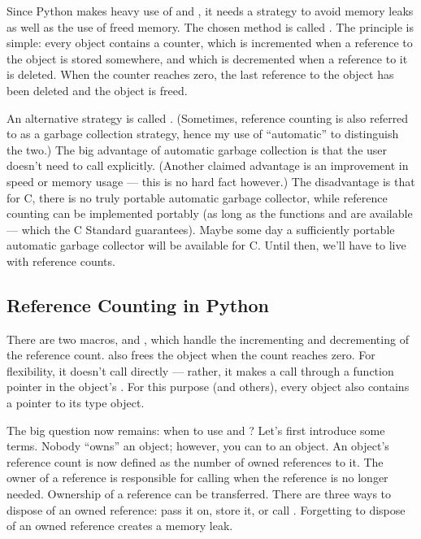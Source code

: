 \documentclass{manual}
\begin{document}
Since Python makes heavy use of  and
, it needs a strategy to avoid memory leaks as well
as the use of freed memory.  The chosen method is called
.  The principle is simple: every object
contains a counter, which is incremented when a reference to the
object is stored somewhere, and which is decremented when a reference
to it is deleted.  When the counter reaches zero, the last reference
to the object has been deleted and the object is freed.

An alternative strategy is called .
(Sometimes, reference counting is also referred to as a garbage
collection strategy, hence my use of ``automatic'' to distinguish the
two.)  The big advantage of automatic garbage collection is that the
user doesn't need to call  explicitly.  (Another claimed
advantage is an improvement in speed or memory usage --- this is no
hard fact however.)  The disadvantage is that for C, there is no
truly portable automatic garbage collector, while reference counting
can be implemented portably (as long as the functions 
and  are available --- which the C Standard guarantees).
Maybe some day a sufficiently portable automatic garbage collector
will be available for C.  Until then, we'll have to live with
reference counts.

\subsection{Reference Counting in Python
            \label{refcountsInPython}}

There are two macros,  and ,
which handle the incrementing and decrementing of the reference count.
 also frees the object when the count reaches zero.
For flexibility, it doesn't call  directly --- rather, it
makes a call through a function pointer in the object's .  For this purpose (and others), every object also contains a
pointer to its type object.

The big question now remains: when to use  and
?  Let's first introduce some terms.  Nobody
``owns'' an object; however, you can  to an
object.  An object's reference count is now defined as the number of
owned references to it.  The owner of a reference is responsible for
calling  when the reference is no longer
needed.  Ownership of a reference can be transferred.  There are three
ways to dispose of an owned reference: pass it on, store it, or call
.  Forgetting to dispose of an owned reference
creates a memory leak.
\end{document}
